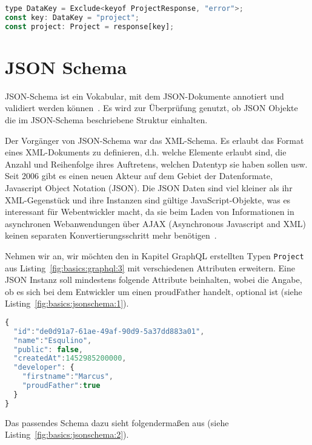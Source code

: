 \begin{lstlisting}[language=Javascript,float=h!,caption={Exclude zum Exkludieren von Schlüsseln}, label={fig:basics:typescript:6}]
type DataKey = Exclude<keyof ProjectResponse, "error">;
const key: DataKey = "project";
const project: Project = response[key];
\end{lstlisting}

\section{JSON Schema}
\label{sec:basics:jsonschema}
JSON-Schema ist ein Vokabular, mit dem JSON-Dokumente  annotiert und validiert werden können~\cite{json-schema}.
Es wird zur Überprüfung genutzt, ob JSON Objekte die im JSON-Schema beschriebene Struktur einhalten.

Der Vorgänger von JSON-Schema war das XML-Schema.
Es erlaubt das Format eines XML-Dokuments zu definieren,
d.h. welche Elemente erlaubt sind, die Anzahl und Reihenfolge ihres Auftretens, welchen Datentyp sie haben sollen usw.
Seit 2006 gibt es einen neuen Akteur auf dem Gebiet der Datenformate, Javascript Object Notation (JSON).
Die JSON Daten sind viel kleiner als ihr XML-Gegenstück und ihre Instanzen sind gültige JavaScript-Objekte, was es interessant für Webentwickler macht, da sie beim Laden von
Informationen in asynchronen Webanwendungen über AJAX (Asynchronous Javascript and XML) keinen separaten Konvertierungsschritt mehr benötigen~\cite{json-schema-xml}.

Nehmen wir an, wir möchten den in Kapitel GraphQL erstellten Typen \texttt{Project} aus Listing~\ref{fig:basics:graphql:3} mit verschiedenen Attributen erweitern.
Eine JSON Instanz soll mindestens folgende Attribute beinhalten, wobei die Angabe, ob es sich bei dem Entwickler um einen proudFather handelt, optional ist (siehe Listing~\ref{fig:basics:jsonschema:1}).

\begin{lstlisting}[language=Javascript,float=h!,caption={Ein Projekt als JSON Objekt}, label={fig:basics:jsonschema:1}]
{
  "id":"de0d91a7-61ae-49af-90d9-5a37dd883a01",
  "name":"Esqulino",
  "public": false,
  "createdAt":1452985200000,
  "developer": {
    "firstname":"Marcus",
    "proudFather":true
  }
}
\end{lstlisting}

Das passendes Schema dazu sieht folgendermaßen aus (siehe Listing~\ref{fig:basics:jsonschema:2}).

